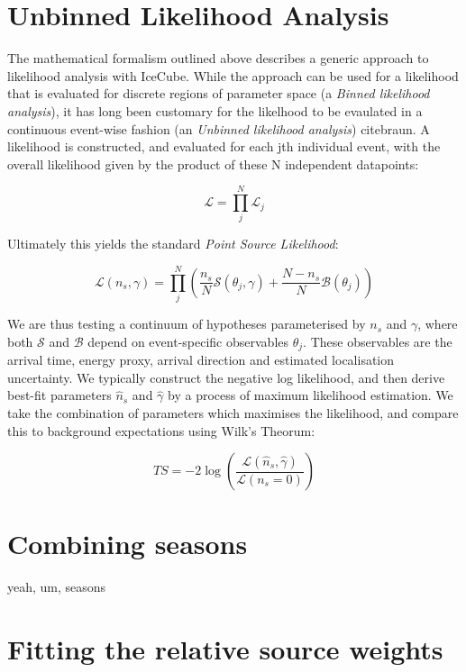 \section{Unbinned Likelihood Analysis}
The mathematical formalism outlined above describes a generic approach to likelihood analysis with IceCube. While the approach can be used for a likelihood that is evaluated for discrete regions of parameter space (a \emph{Binned likelihood analysis}), it has long been customary for the likelhood to be evaulated in a continuous event-wise fashion (an \emph{Unbinned likelihood analysis}) citebraun. A likelihood is constructed, and evaluated for each jth individual event, with the overall likelihood given by the product of these N independent datapoints:

\[ \mathcal{L} = \prod_{j}^{N} \mathcal{L}_{j} \]

Ultimately this yields the standard \emph{Point Source Likelihood}:

\[ \mathcal{L}(n_{s}, \gamma) = \prod_{j}^{N} \left(\frac{n_{s}}{N} \mathcal{S}(\theta_{j}, \gamma) + \frac{N - n_{s}}{N} \mathcal{B}(\theta_{j})  \right)\]

We are thus testing a continuum of hypotheses parameterised by $n_{s}$ and $\gamma$, where both $\mathcal{S}$ and $\mathcal{B}$ depend on event-specific observables $\theta_{j}$. These observables are the arrival time, energy proxy, arrival direction and estimated localisation uncertainty. We typically construct the negative log likelihood, and then derive best-fit parameters $\hat{n}_{s}$ and  $\hat{\gamma}$ by a process of maximum likelihood estimation. We take the combination of parameters which maximises the likelihood, and compare this to background expectations using Wilk's Theorum:

\[ TS = - 2 \log \left( \frac{ \mathcal{L}(\hat{n}_{s}, \hat{\gamma}) }{\mathcal{L}(n_{s} = 0)} \right)\]

\section{Combining seasons}

yeah, um, seasons

\section{Fitting the relative source weights}

